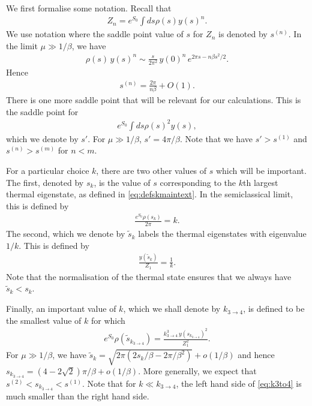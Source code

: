 \documentclass[11pt]{article}
\renewcommand{\tilde}{\widetilde}
\newcommand{\smax}{s_k}
\newcommand{\stilde}{\tilde{s}_k}
\newcommand{\sprime}{s'}
\numberwithin{equation}{section}
\begin{document}
We first formalise some notation. Recall that
\begin{align}
Z_n = e^{S_0} \int ds \rho(s) y (s)^n.
\end{align}
We use notation where the saddle point value of $s$ for $Z_n$ is denoted by $s^{(n)}$.  In the limit $\mu \gg 1/\beta$, we have
\begin{align}
\rho(s)\, y(s)^n \sim \frac{s}{2 \pi^2}\, y(0)^n\, e^{2 \pi s - n\beta s^2/2}.
\end{align}
Hence
\begin{align}
s^{(n)} = \frac{2 \pi}{n\beta} + O(1).
\end{align}
There is one more saddle point that will be relevant for our calculations. This is the saddle point for
\begin{align}
e^{S_0} \int ds \rho(s)^2 y (s),
\end{align}
which we denote by $\sprime$. For $\mu \gg 1/\beta$, $\sprime = 4 \pi /\beta$. Note that we have $\sprime > s^{(1)}$ and $s^{(n)} > s^{(m)}$ for $n < m$.

For a particular choice $k$, there are two other values of $s$ which will be important. The first, denoted by $\smax$, is the value of $s$ corresponding to the $k$th  largest thermal eigenstate, as defined in \eqref{eq:defskmaintext}. In the semiclassical limit, this is defined by 
\begin{align} \label{eq:defsk}
\frac{e^{S_0} \rho(\smax)}{2 \pi} = k.
\end{align} 
The second, which we denote by $\stilde$ labels the thermal eigenstates with eigenvalue $1/k$. This is defined by 
\begin{align}\label{eq:defstildek}
\frac{y(\stilde)}{ Z_1} = \frac{1}{k}.
\end{align}
Note that the normalisation of the thermal state ensures that we always have $\stilde < \smax$. 

Finally, an important value of $k$, which we shall denote by $k_{3 \to 4}$, is defined to be the smallest value of $k$ for which
\begin{align} \label{eq:k3to4}
e^{S_0} \rho(\tilde{s}_{k_{3 \to 4}}) = \frac{k_{3 \to 4}^3 \, y(s_{k_{3\to 4}})^2}{Z_1^2}.
\end{align}
For $\mu \gg 1/\beta$, we have $\stilde = \sqrt{2 \pi (2 \smax/\beta -  2 \pi/\beta^2)} + o(1/\beta)$ and hence $s_{k_{3\to 4}} = (4 - 2\sqrt{2}) \pi/ \beta + o(1/\beta)$. More generally, we expect that $s^{(2)} < s_{k_{3\to 4}} < s^{(1)}$. Note that for $k \ll k_{3 \to 4}$, the left hand side of \eqref{eq:k3to4} is much smaller than the right hand side.
\end{document}
